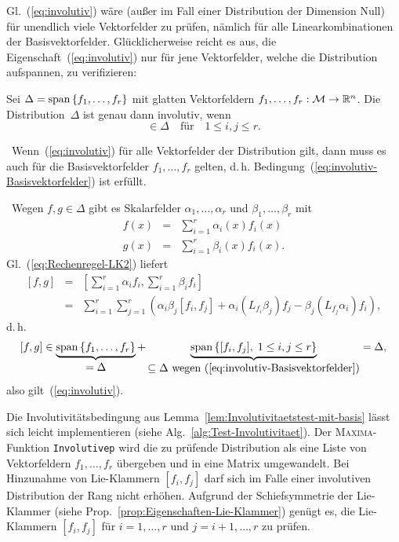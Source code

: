 Gl.~(\ref{eq:involutiv}) wäre (außer im Fall einer Distribution
der Dimension Null) für unendlich viele Vektorfelder zu prüfen, nämlich
für alle Linearkombinationen der Basisvektorfelder. Glücklicherweise
reicht es aus, die Eigenschaft~(\ref{eq:involutiv}) nur für jene
Vektorfelder, welche die Distribution aufspannen, zu verifizieren:
\begin{lemma}
\label{lem:Involutivitaetstest-mit-basis}Sei $\Delta={\operatorname{span}}\left\{ f_{1},\ldots,f_{r}\right\} $
mit glatten Vektorfeldern $f_{1},\ldots,f_{r}:\mathcal{M}\to{\mathbb{R}}^{n}$.
Die Distribution~$\Delta$ ist genau dann involutiv, wenn 
\begin{equation}
[f_{i},f_{j}]\in\Delta\quad\mbox{für}\quad1\leq i,j\leq r.\label{eq:involutiv-Basisvektorfelder}
\end{equation}
\end{lemma}
\begin{svmultproof2}
\notwendig\ Wenn~(\ref{eq:involutiv}) für alle Vektorfelder der
Distribution gilt, dann muss es auch für die Basisvektorfelder $f_{1},\ldots,f_{r}$
gelten, d.\,h. Bedingung~(\ref{eq:involutiv-Basisvektorfelder})
ist erfüllt.

\hinreichend\ Wegen $f,g\in\Delta$ gibt es Skalarfelder $\alpha_{1},\ldots,\alpha_{r}$
und $\beta_{1},\ldots,\beta_{r}$ mit 
\begin{eqnarray*}
f(x) & = & \sum_{i=1}^{r}\alpha_{i}(x)f_{i}(x)\\
g(x) & = & \sum_{i=1}^{r}\beta_{i}(x)f_{i}(x).
\end{eqnarray*}
Gl.~(\ref{eq:Rechenregel-LK2}) liefert 
\[
\begin{array}{rcl}
[f,g] & = & [\sum\limits _{i=1}^{r}\alpha_{i}f_{i},\sum\limits _{i=1}^{r}\beta_{i}f_{i}]\\
 & = & \sum\limits _{i=1}^{r}\sum\limits _{j=1}^{r}\left(\alpha_{i}\beta_{j}[f_{i},f_{j}]+\alpha_{i}(L_{f_{i}}\beta_{j})f_{j}-\beta_{j}(L_{f_{j}}\alpha_{i})f_{i}\right),
\end{array}
\]
d.\,h. 
\[
[f,g]\in\underbrace{{\operatorname{span}}\left\{ f_{1},\ldots,f_{r}\right\} }_{{\displaystyle =\Delta}}+\underbrace{{\operatorname{span}}\left\{ [f_{i},f_{j}],\;1\leq i,j\leq r\right\} }_{{\displaystyle \subseteq\Delta\mbox{ wegen }(\ref{eq:involutiv-Basisvektorfelder})}}=\Delta,
\]
also gilt~(\ref{eq:involutiv}).
\end{svmultproof2}

Die Involutivitätsbedingung aus Lemma~\ref{lem:Involutivitaetstest-mit-basis}
lässt sich leicht implementieren (siehe Alg.~\ref{alg:Test-Involutivitaet}).
Der \textsc{Maxima}-Funktion \texttt{Involutivep} wird die zu prüfende
Distribution als eine Liste von Vektorfeldern $f_{1},\ldots,f_{r}$
übergeben und in eine Matrix umgewandelt. Bei Hinzunahme von Lie-Klammern
$[f_{i},f_{j}]$ darf sich im Falle einer involutiven Distribution
der Rang nicht erhöhen. Aufgrund der Schiefsymmetrie der Lie-Klammer
(siehe Prop.~\ref{prop:Eigenschaften-Lie-Klammer}) genügt es, die
Lie-Klammern $[f_{i},f_{j}]$ für $i=1,\ldots,r$ und $j=i+1,\ldots,r$
zu prüfen.

